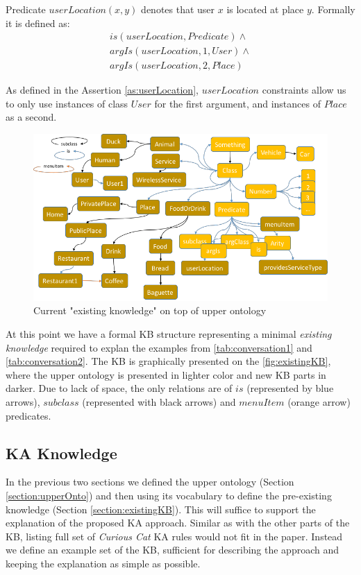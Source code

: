 \begin{definition}\label{def:userLocation}
Predicate $userLocation(x,y)$ denotes that user $x$ is located at place 
$y$. Formally it is defined as:
\begin{equation}\label{as:userLocation}
\begin{gathered}
    is(userLocation,Predicate) \land \\
	argIs(userLocation,1,User) \land\\
	argIs(userLocation,2, Place)
\end{gathered}
\end{equation}
\end{definition}
As defined in the Assertion \ref{as:userLocation}, $userLocation$
constraints allow us to only use instances of class $User$ for the first
argument, and instances of $Place$ as a second.

\begin{figure}[H]
	\centering
		\includegraphics[width=1\textwidth]{figures/fullExistingKB.png}
	\caption{Current "existing knowledge" on top of upper ontology}
	\label{fig:existingKB}
\end{figure}

At this point we have a formal KB structure representing a minimal 
\emph{existing knowledge} required to explan the examples from 
\autoref{tab:conversation1} and \autoref{tab:conversation2}. The KB is
graphically presented on the \autoref{fig:existingKB}, where the upper ontology
is presented in lighter color and new KB parts in darker. Due to lack of space,
the only relations are of $is$ (represented by blue arrows), $subclass$ 
(represented with black arrows) and $menuItem$ (orange arrow) predicates.

\subsection{KA Knowledge}
\label{section:kakb}
In the previous two sections we defined the upper ontology
(Section \ref{section:upperOnto}) and then using its vocabulary to define the 
pre-existing knowledge (Section \ref{section:existingKB}). This will suffice to
support the explanation of the proposed KA approach. Similar as with the other
parts of the KB, listing full set of 
\emph{Curious Cat} KA rules would not fit in the paper. Instead we define an 
example set of the KB, sufficient for describing the approach and keeping the 
explanation as simple as possible. 

